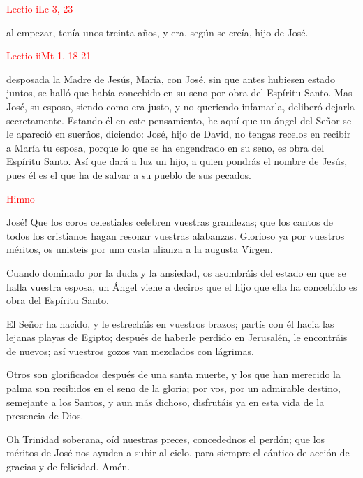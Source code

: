 \noindent\textcolor{red}{Lectio i\hfill Lc 3, 23}

al empezar, tenía unos treinta años, y era, según se creía, hijo de José.

\vspace{0.5em}

\noindent\textcolor{red}{Lectio ii\hfill Mt 1, 18-21}

desposada la Madre de Jesús, María, con José, sin que antes hubiesen estado juntos, se halló que había concebido en su seno por obra del Espíritu Santo. Mas José, su esposo,
siendo como era justo, y no queriendo infamarla, deliberó dejarla secretamente. Estando él en este pensamiento, he aquí que un ángel del Señor se le apareció en suerños, diciendo:
José, hijo de David, no tengas recelos en recibir a María tu esposa, porque lo que se ha engendrado en su seno, es obra del Espíritu Santo. Así que dará a luz un hijo, a quien pondrás
el nombre de Jesús, pues él es el que ha de salvar a su pueblo de sus pecados.

\begin{center}
      \textcolor{red}{Himno}
\end{center}

\vspace{-0.5em}

José! Que los coros celestiales celebren vuestras grandezas; que los cantos de todos los cristianos hagan resonar vuestras alabanzas. Glorioso ya por vuestros méritos, os
unisteis por una casta alianza a la augusta Virgen.

Cuando dominado por la duda y la ansiedad, os asombráis del estado en que se halla vuestra esposa, un Ángel viene a deciros que el hijo que ella ha concebido es obra del Espíritu Santo.

El Señor ha nacido, y le estrecháis en vuestros brazos; partís con él hacia las lejanas playas de Egipto; después de haberle perdido en Jerusalén, le encontráis de nuevos; así vuestros gozos
van mezclados con lágrimas.

Otros son glorificados después de una santa muerte, y los que han merecido la palma son recibidos en el seno de la gloria; por vos, por un admirable destino, semejante a los Santos, y aun
más dichoso, disfrutáis ya en esta vida de la presencia de Dios.

Oh Trinidad soberana, oíd nuestras preces, concedednos el perdón; que los méritos de José nos ayuden a subir al cielo, para siempre el cántico de acción de gracias y de felicidad. Amén.


